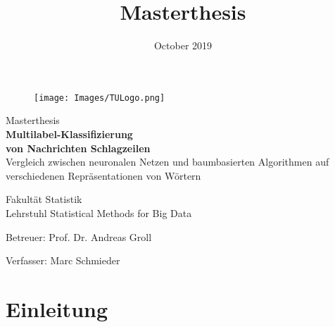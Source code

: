 \documentclass[a4paper,11pt]{article}
\begin{document}
\begin{titlepage}

\vspace*{3cm}


\begin{figure}[t]
\begin{flushright}
\texttt{[image: Images/TULogo.png]}


\end{flushright}
\end{figure}
\vspace*{3cm}


\begin{center}

\vspace*{2cm}

\title{Masterthesis}



{\huge Masterthesis}\\
 {\huge{\textbf{Multilabel-Klassifizierung \\
 von Nachrichten Schlagzeilen}}\\}
 \vspace{0.2cm}
 {\large  Vergleich zwischen neuronalen Netzen und baumbasierten Algorithmen auf verschiedenen Repräsentationen von Wörtern\\}
\vspace*{5cm}


{\large  Fakultät Statistik\\
Lehrstuhl Statistical Methods for Big Data }
\vspace*{0.5cm}

 \begin{large}
 Betreuer: Prof. Dr. Andreas Groll\\
  \end{large}

  \begin{large}
Verfasser: Marc Schmieder\\
\date{October 2019}
   \vspace*{2cm}

 \end{large}
\end{center}
\newpage
\thispagestyle{empty}
\tableofcontents
\newpage
\end{titlepage}







\section{Einleitung}
\end{document}
